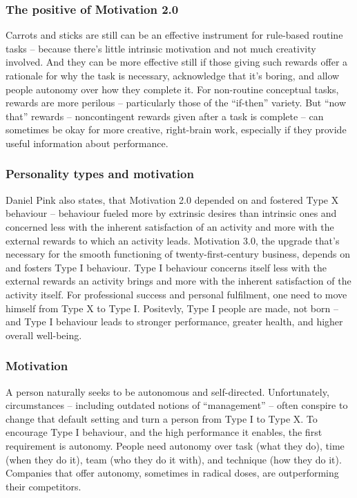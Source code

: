 \subsubsection{The positive of Motivation 2.0}
Carrots and sticks are still can be an effective instrument for rule-based routine tasks -- because there’s little intrinsic motivation and not much creativity involved. And they can be more effective still if those giving such rewards offer a rationale for why the task is necessary, acknowledge that it’s boring, and allow people autonomy over how they complete it.
For non-routine conceptual tasks, rewards are more perilous -- particularly those of the ``if-then'' variety. But ``now that'' rewards -- noncontingent rewards given after a task is complete -- can sometimes be okay for more creative, right-brain work, especially if they provide useful information about performance.

\subsubsection{Personality types and motivation}
Daniel Pink also states, that Motivation 2.0 depended on and fostered Type X behaviour -- behaviour fueled more by extrinsic desires than intrinsic ones and concerned less with the inherent satisfaction of an activity and more with the external rewards to which an activity leads. Motivation 3.0, the upgrade that’s necessary for the smooth functioning of twenty-first-century business, depends on and fosters Type I behaviour. Type I behaviour concerns itself less with the external rewards an activity brings and more with the inherent satisfaction of the activity itself. For professional success and personal fulfilment, one need to move himself from Type X to Type I. Positevly, Type I people are made, not born -- and Type I behaviour leads to stronger performance, greater health, and higher overall well-being.

\subsubsection{Motivation}
A person naturally seeks to be autonomous and self-directed. Unfortunately, circumstances -- including outdated notions of ``management'' -- often conspire to change that default setting and turn a person from Type I to Type X. To encourage Type I behaviour, and the high performance it enables, the first requirement is autonomy. People need autonomy over task (what they do), time (when they do it), team (who they do it with), and technique (how they do it). Companies that offer autonomy, sometimes in radical doses, are outperforming their competitors.

